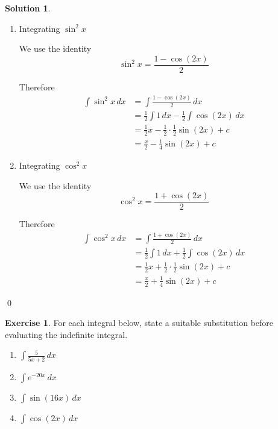 \documentclass[a4paper]{article}
\theoremstyle{plain} %
\theoremstyle{definition} %
\newtheorem*{solution}{Solution}
\newtheorem{exercise}{Exercise}
\numberwithin{equation}{subsection}
\begin{document}
\begin{solution}

\begin{enumerate}
    \item Integrating $\sin^2 x$

    We use the identity
    \[
        \sin^2 x = \frac{1-\cos(2x)}{2}
    \]

    Therefore
    \begin{align*}
        \int \sin^2 x\,dx
        &= \int \frac{1-\cos(2x)}{2}\,dx\\
        &= \frac{1}{2}\int 1\,dx - \frac{1}{2}\int \cos(2x)\,dx\\
        &= \frac{1}{2}x - \frac{1}{2}\cdot\frac{1}{2}\sin(2x) + c\\
        &= \frac{x}{2} - \frac{1}{4}\sin(2x) + c
    \end{align*}

    \item Integrating $\cos^2 x$

    We use the identity
    \[
        \cos^2 x = \frac{1+\cos(2x)}{2}
    \]

    Therefore
    \begin{align*}
        \int \cos^2 x\,dx
        &= \int \frac{1+\cos(2x)}{2}\,dx\\
        &= \frac{1}{2}\int 1\,dx + \frac{1}{2}\int \cos(2x)\,dx\\
        &= \frac{1}{2}x + \frac{1}{2}\cdot\frac{1}{2}\sin(2x) + c\\
        &= \frac{x}{2} + \frac{1}{4}\sin(2x) + c
    \end{align*}
\end{enumerate}
\qed
\end{solution}


\begin{exercise}
For each integral below, state a suitable substitution before evaluating the indefinite integral.
\begin{enumerate}
    \item $\displaystyle \int \frac{5}{5x+2}\,dx$
    \item $\displaystyle \int e^{-20x}\,dx$
    \item $\displaystyle \int \sin(16x)\,dx$
    \item $\displaystyle \int \cos(2x)\,dx$
\end{enumerate}
\end{exercise}
\end{document}
